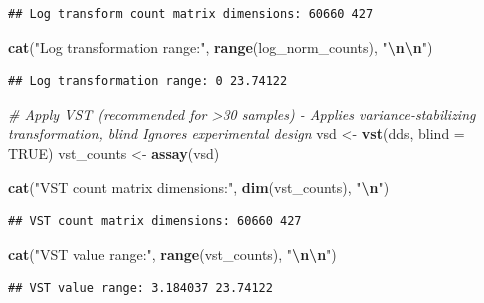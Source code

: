 \documentclass[
]{article}
\newenvironment{Shaded}{\begin{snugshade}}{\end{snugshade}}
\newcommand{\AttributeTok}[1]{\textcolor[rgb]{0.13,0.29,0.53}{#1}}
\newcommand{\CommentTok}[1]{\textcolor[rgb]{0.56,0.35,0.01}{\textit{#1}}}
\newcommand{\ConstantTok}[1]{\textcolor[rgb]{0.56,0.35,0.01}{#1}}
\newcommand{\FunctionTok}[1]{\textcolor[rgb]{0.13,0.29,0.53}{\textbf{#1}}}
\newcommand{\NormalTok}[1]{#1}
\newcommand{\OtherTok}[1]{\textcolor[rgb]{0.56,0.35,0.01}{#1}}
\newcommand{\SpecialCharTok}[1]{\textcolor[rgb]{0.81,0.36,0.00}{\textbf{#1}}}
\newcommand{\StringTok}[1]{\textcolor[rgb]{0.31,0.60,0.02}{#1}}
\begin{document}
\begin{verbatim}
## Log transform count matrix dimensions: 60660 427
\end{verbatim}

\begin{Shaded}
\begin{Highlighting}[]
\FunctionTok{cat}\NormalTok{(}\StringTok{"Log transformation range:"}\NormalTok{, }\FunctionTok{range}\NormalTok{(log\_norm\_counts), }\StringTok{"}\SpecialCharTok{\textbackslash{}n\textbackslash{}n}\StringTok{"}\NormalTok{)}
\end{Highlighting}
\end{Shaded}

\begin{verbatim}
## Log transformation range: 0 23.74122
\end{verbatim}

\begin{Shaded}
\begin{Highlighting}[]
\CommentTok{\# Apply VST (recommended for \textgreater{}30 samples) {-} Applies variance{-}stabilizing transformation, \textquotesingle{}blind\textquotesingle{} Ignores experimental design}
\NormalTok{vsd }\OtherTok{\textless{}{-}} \FunctionTok{vst}\NormalTok{(dds, }\AttributeTok{blind =} \ConstantTok{TRUE}\NormalTok{)}
\NormalTok{vst\_counts }\OtherTok{\textless{}{-}} \FunctionTok{assay}\NormalTok{(vsd)}

\FunctionTok{cat}\NormalTok{(}\StringTok{"VST count matrix dimensions:"}\NormalTok{, }\FunctionTok{dim}\NormalTok{(vst\_counts), }\StringTok{"}\SpecialCharTok{\textbackslash{}n}\StringTok{"}\NormalTok{)}
\end{Highlighting}
\end{Shaded}

\begin{verbatim}
## VST count matrix dimensions: 60660 427
\end{verbatim}

\begin{Shaded}
\begin{Highlighting}[]
\FunctionTok{cat}\NormalTok{(}\StringTok{"VST value range:"}\NormalTok{, }\FunctionTok{range}\NormalTok{(vst\_counts), }\StringTok{"}\SpecialCharTok{\textbackslash{}n\textbackslash{}n}\StringTok{"}\NormalTok{)}
\end{Highlighting}
\end{Shaded}

\begin{verbatim}
## VST value range: 3.184037 23.74122
\end{verbatim}
\end{document}
